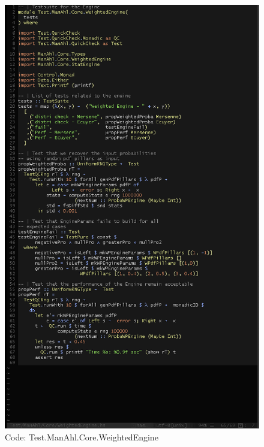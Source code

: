 \documentclass[12pt,a4paper,article]{memoir} %
\begin{document}
\begin{figure}[h!]
\centering
\includegraphics[width=1\textwidth]{img/code-test-w.png}
\caption{Code: Test.ManAhl.Core.WeightedEngine }
\label{fig:test.w}
\end{figure}
\end{document}

